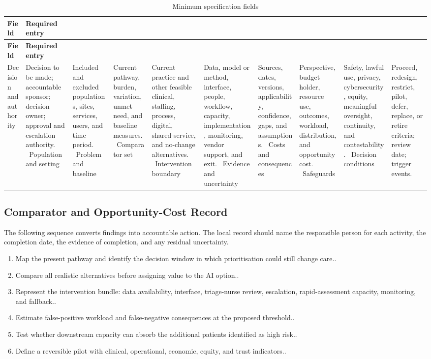 \begin{longtable}{@{}p{}p{}@{}}
\caption{Minimum specification fields}
\label{tab:comp-ch01-spec-fields}\\
\toprule
\textbf{Field} & \textbf{Required entry} \\
\midrule
\endfirsthead
\toprule
\textbf{Field} & \textbf{Required entry} \\
\midrule
\endhead
\bottomrule
\endlastfoot
Decision and authority & Decision to be made; accountable sponsor; decision owner; approval and escalation authority. \
Population and setting & Included and excluded populations, sites, services, users, and time period. \
Problem and baseline & Current pathway, burden, variation, unmet need, and baseline measures. \
Comparator set & Current practice and other feasible clinical, staffing, process, digital, shared-service, and no-change alternatives. \
Intervention boundary & Data, model or method, interface, people, workflow, capacity, implementation, monitoring, vendor support, and exit. \
Evidence and uncertainty & Sources, dates, versions, applicability, confidence, gaps, and assumptions. \
Costs and consequences & Perspective, budget holder, resource use, outcomes, workload, distribution, and opportunity cost. \
Safeguards & Safety, lawful use, privacy, cybersecurity, equity, meaningful oversight, continuity, and contestability. \
Decision conditions & Proceed, redesign, restrict, pilot, defer, replace, or retire criteria; review date; trigger events. \
\end{longtable}

\subsection{Comparator and Opportunity-Cost Record}
\label{sec:comp-ch01-supp-2}
The following sequence converts findings into accountable action. The local record
should name the responsible person for each activity, the completion date, the
evidence of completion, and any residual uncertainty.

\begin{enumerate}
 \item Map the present pathway and identify the decision window in which prioritisation could still change care..
 \item Compare all realistic alternatives before assigning value to the AI option..
 \item Represent the intervention bundle: data availability, interface, triage-nurse review, escalation, rapid-assessment capacity, monitoring, and fallback..
 \item Estimate false-positive workload and false-negative consequences at the proposed threshold..
 \item Test whether downstream capacity can absorb the additional patients identified as high risk..
 \item Define a reversible pilot with clinical, operational, economic, equity, and trust indicators..
\end{enumerate}

